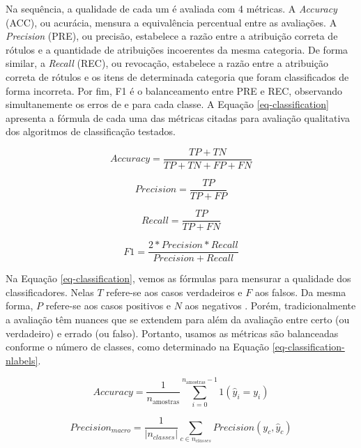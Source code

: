 Na sequência, a qualidade de cada um é avaliada com 4 métricas. A \textit{Accuracy} (ACC), ou acurácia, mensura a equivalência percentual entre as avaliações. A \textit{Precision} (PRE), ou precisão, estabelece a razão entre a atribuição correta de rótulos e a quantidade de atribuições incoerentes da mesma categoria. De forma similar, a \textit{Recall} (REC), ou revocação, estabelece a razão entre a atribuição correta de rótulos e os itens de determinada categoria que foram classificados de forma incorreta. Por fim, F1 é o balanceamento entre PRE e REC, observando simultanemente os erros de e para cada classe. A Equação \ref{eq-classification} apresenta a fórmula de cada uma das métricas citadas para avaliação qualitativa dos algoritmos de classificação testados.

\begin{equation}
Accuracy = \frac{TP+TN}{TP+TN+FP+FN}
\label{eq-classification}
\end{equation}

\begin{equation*}
Precision = \frac{TP}{TP+FP}
\end{equation*}

\begin{equation*}
Recall = \frac{TP}{TP+FN}
\end{equation*}

\begin{equation*}
F{1} = \frac{2*Precision*Recall}{Precision+Recall}
\end{equation*}

Na Equação \ref{eq-classification}, vemos as fórmulas para mensurar a qualidade dos classificadores. Nelas $ T $ refere-se aos casos verdadeiros e $ F $ aos falsos. Da mesma forma, $ P $ refere-se aos casos positivos e $ N $ aos negativos \cite{manning2008}. Porém, tradicionalmente a avaliação têm nuances que se extendem para além da avaliação entre certo (ou verdadeiro) e errado (ou falso). Portanto, usamos as métricas são balanceadas conforme o número de classes, como determinado na Equação \ref{eq-classification-nlabels}. 

\begin{equation}
Accuracy = \frac{1}{n_\text{amostras}} \sum_{i=0}^{n_\text{amostras}-1} 1(\hat{y}_i = y_i)
\label{eq-classification-nlabels}
\end{equation}

\begin{equation*}
Precision_{macro} = \frac{1}{\left|n_{classes}\right|} \sum_{c \in n_{classes}} Precision(y_c, \hat{y}_c)
\end{equation*}

